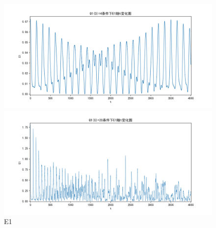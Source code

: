 \documentclass[10pt, a4paper]{article}
\begin{document}
    \begin{figure}[H]
        \begin{minipage}[t]{0.49\textwidth}
            \centering
            \includegraphics[width=\textwidth]{./q5_pics/cmp/E1.png}
        \end{minipage}
        \begin{minipage}[t]{0.49\textwidth}
            \centering
            \includegraphics[width=\textwidth]{./q5_pics/exp/E1.png}
        \end{minipage}
        \caption{E1}\label{fig:E1 in q5}
    \end{figure}
\end{document}
